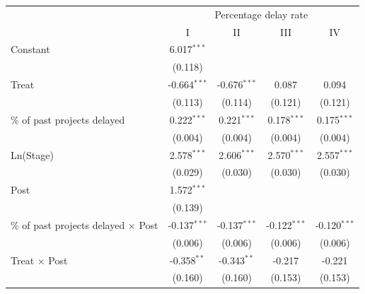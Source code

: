 \documentclass[
]{article}
\begin{document}
\begin{tabular}{lcccc}
   \toprule
    & \multicolumn{4}{c}{Percentage delay rate}\\
                                                               & I              & II             & III            & IV\\  
   Constant                                                    & 6.017$^{***}$  &                &                &   \\   
                                                               & (0.118)        &                &                &   \\   
   Treat                                                       & -0.664$^{***}$ & -0.676$^{***}$ & 0.087          & 0.094\\   
                                                               & (0.113)        & (0.114)        & (0.121)        & (0.121)\\   
   \% of past projects delayed                                 & 0.222$^{***}$  & 0.221$^{***}$  & 0.178$^{***}$  & 0.175$^{***}$\\   
                                                               & (0.004)        & (0.004)        & (0.004)        & (0.004)\\   
   Ln(Stage)                                                   & 2.578$^{***}$  & 2.606$^{***}$  & 2.570$^{***}$  & 2.557$^{***}$\\   
                                                               & (0.029)        & (0.030)        & (0.030)        & (0.030)\\   
   Post                                                        & 1.572$^{***}$  &                &                &   \\   
                                                               & (0.139)        &                &                &   \\   
   \% of past projects delayed $\times$ Post                   & -0.137$^{***}$ & -0.137$^{***}$ & -0.122$^{***}$ & -0.120$^{***}$\\   
                                                               & (0.006)        & (0.006)        & (0.006)        & (0.006)\\   
   Treat $\times$ Post                                         & -0.358$^{**}$  & -0.343$^{**}$  & -0.217         & -0.221\\   
                                                               & (0.160)        & (0.160)        & (0.153)        & (0.153)\\   

\end{tabular}
\end{document}
